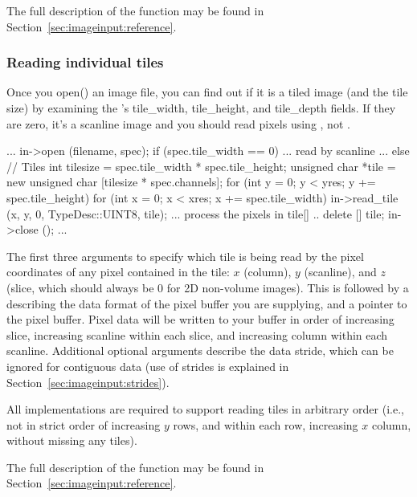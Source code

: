 The full description of the \readscanline function may be found
in Section~\ref{sec:imageinput:reference}.

\subsubsection{Reading individual tiles}

Once you {\kw open()} an image file, you can find out if it is a tiled
image (and the tile size) by examining the \ImageSpec's {\cf
  tile_width}, {\cf tile_height}, and {\cf tile_depth} fields.
If they are zero, it's a scanline image and you should read pixels
using \readscanline, not \readtile.

\begin{code}
        ...
        in->open (filename, spec);
        if (spec.tile_width == 0) {
            ... read by scanline ...
        } else {
            // Tiles
            int tilesize = spec.tile_width * spec.tile_height;
            unsigned char *tile = new unsigned char [tilesize * spec.channels];
            for (int y = 0;  y < yres;  y += spec.tile_height) {
                for (int x = 0;  x < xres;  x += spec.tile_width) {
                    in->read_tile (x, y, 0, TypeDesc::UINT8, tile);
                    ... process the pixels in tile[] ..
                }
            }
            delete [] tile;
        }
        in->close ();
        ...
\end{code}

The first three arguments to \readtile specify which tile is
being read by the pixel coordinates of any pixel contained in the
tile: $x$ (column), $y$ (scanline), and $z$ (slice, which should always
be 0 for 2D non-volume images).  This is followed by a \TypeDesc
describing the data format of the pixel buffer you are supplying, and a
pointer to the pixel buffer.  Pixel data will be written to your buffer
in order of increasing slice, increasing
scanline within each slice, and increasing column within each scanline.
Additional optional arguments describe the data stride, which can be
ignored for contiguous data (use of strides is explained in
Section~\ref{sec:imageinput:strides}).

All \ImageInput implementations are required to support reading tiles in
arbitrary order (i.e., not in strict order of increasing $y$ rows, and
within each row, increasing $x$ column, without missing any tiles).

The full description of the \readtile function may be found
in Section~\ref{sec:imageinput:reference}.


